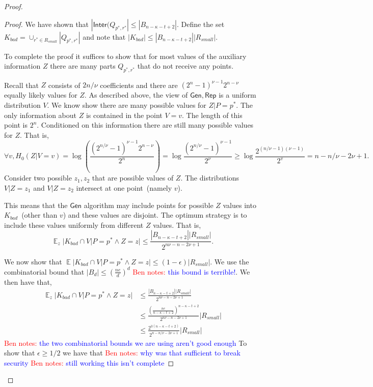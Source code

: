 \documentclass[11pt]{article}
\DeclareMathOperator*{\expe}{\mathbb{E}}
\newcommand{\class}[1]{{\ensuremath{\mathsf{#1}}}}
\newcommand{\gen}{\ensuremath{\class{Gen}}\xspace}
\newcommand{\rep}{\ensuremath{\class{Rep}}\xspace}
\newcommand{\inter}{\ensuremath{\class{Inter}}\xspace}
\newcommand{\authnote}[2]{{\textcolor{red}{\textsf{#1 notes: }\textcolor{blue}{ #2}}\marginpar{\textcolor{red}{\textbf{!!!!!}}}}}
\newcommand{\authnote}[2]{}
\newcommand{\bnote}[1]{{\authnote{Ben}{#1}}}
\begin{document}
\begin{proof}
\begin{proof}
We have shown that $|\inter(Q_{p^*, r^*}| \le |B_{n-\kappa -t+2}|$.  Define the set $K_{bad} = \cup_{r^*\in R_{small}} |Q_{p^*, r^*}|$ and note that $|K_{bad} | \le  |B_{n-\kappa -t+2}||R_{small}|$.

To complete the proof it suffices to show that for most values of the auxiliary information $Z$ there are many parts $Q_{p^*, r^*}$ that do not receive any points.  

Recall that $Z$ consists of $2n/\nu$ coefficients and there are $(2^n-1)^{\nu-1} 2^{n-\nu}$ equally likely values for $Z$.
 As described above, the view of $\gen, \rep$ is a uniform distribution $V$.  We know show there are many possible values for $Z |P=p^*$.  The only information about $Z$ is contained in the point  $V=v$.  The length of this point is $2^n$.  Conditioned on this information there are still many possible values for $Z$.  That is, 
 \[
 \forall v, H_0(Z | V=v) =\log \left(\frac{(2^{n/\nu}-1)^{\nu-1} 2^{n-\nu}}{2^n} \right) = \log \frac{(2^{n/\nu}-1)^{\nu-1}}{2^{\nu}} \ge \log \frac{2^{(n/\nu-1)(\nu -1)}}{2^v} = n -n/\nu - 2\nu +1.
 \]
Consider two possible $z_1, z_2$ that are possible values of $Z$.  The distributions $V| Z=z_1$ and $V | Z=z_2$ intersect at one point~(namely $v$).  

This means that the $\gen$ algorithm may include points for possible $Z$ values into $K_{bad}$~(other than $v$) and these values are disjoint.  The optimum strategy is to include these values uniformly from different $Z$ values.  That is, 
\[
\expe_z |K_{bad} \cap V | P=p^* \wedge Z=z | \le \frac{|B_{n-\kappa -t+2}||R_{small}|}{2^{n\nu -n -2\nu +1}}.
\]

We now show that $\expe | K_{bad} \cap V | P=p^* \wedge Z=z| \le (1- \epsilon) |R_{small}|$. 
We use the combinatorial bound that $|B_d| \le \left(\frac{ne}{d}\right)^d$ \bnote{this bound is terrible!}.  We then have that, 
\begin{align*}
\expe_z |K_{bad} \cap V | P=p^* \wedge Z=z | &\le \frac{|B_{n-\kappa -t+2}||R_{small}|}{2^{n\nu -n -2\nu +1}}\\
&\le  \frac{\left(\frac{ne}{n-\kappa -t+2}\right)^{n-\kappa -t+2}}{2^{n\nu -n-2\nu+1}}|R_{small}|\\
&\le \frac{2^{3(n-\kappa -t +2)}}{2^{n -n/\nu-2\nu+1}}|R_{small}|
\end{align*}
\bnote{the two combinatorial bounds we are using aren't good enough}
To show that $\epsilon \ge 1/2$ we have that 
\bnote{why was that sufficient to break security}
\bnote{still working this isn't complete}
\end{proof}
\end{proof}
\end{document}
